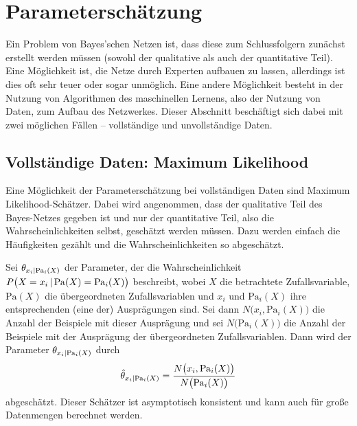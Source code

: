 	\section{Parameterschätzung}
		Ein Problem von Bayes'schen Netzen ist, dass diese zum Schlussfolgern zunächst erstellt werden müssen (sowohl der qualitative als auch der quantitative Teil). Eine Möglichkeit ist, die Netze durch Experten aufbauen zu lassen, allerdings ist dies oft sehr teuer oder sogar unmöglich. Eine andere Möglichkeit besteht in der Nutzung von Algorithmen des maschinellen Lernens, also der Nutzung von Daten, zum Aufbau des Netzwerkes. Dieser Abschnitt beschäftigt sich dabei mit zwei möglichen Fällen -- vollständige und unvollständige Daten.

		\subsection{Vollständige Daten: Maximum Likelihood}
			Eine Möglichkeit der Parameterschätzung bei vollständigen Daten sind Maximum Likelihood-Schätzer. Dabei wird angenommen, dass der qualitative Teil des Bayes-Netzes gegeben ist und nur der quantitative Teil, also die Wahrscheinlichkeiten selbst, geschätzt werden müssen. Dazu werden einfach die Häufigkeiten gezählt und die Wahrscheinlichkeiten so abgeschätzt.

			Sei \( \theta_{x_i \vert \mathrm{Pa}_i(X)} \) der Parameter, der die Wahrscheinlichkeit \( P\big( X = x_i \,\vert\, \mathrm{Pa}(X) = \mathrm{Pa}_i(X) \big) \) beschreibt, wobei \(X\) die betrachtete Zufallsvariable, \( \mathrm{Pa}(X) \) die übergeordneten Zufallsvariablen und \(x_i\) und \(\mathrm{Pa}_i(X)\) ihre entsprechenden (\bzw eine der) Ausprägungen sind. Sei dann \( N\big( x_i, \mathrm{Pa}_i(X) \big) \) die Anzahl der Beispiele mit dieser Ausprägung und sei \( N\big( \mathrm{Pa}_i(X) \big) \) die Anzahl der Beispiele mit der Ausprägung der übergeordneten Zufallsvariablen. Dann wird der Parameter \( \theta_{x_i \vert \mathrm{Pa}_i(X)} \) durch
			\begin{equation}
				\hat{\theta}_{x_i \vert \mathrm{Pa}_i(X)} = \frac{N\big( x_i, \mathrm{Pa}_i(X) \big)}{N\big( \mathrm{Pa}_i(X) \big)}
			\end{equation}
			abgeschätzt. Dieser Schätzer ist asymptotisch konsistent und kann auch für große Datenmengen berechnet werden.

